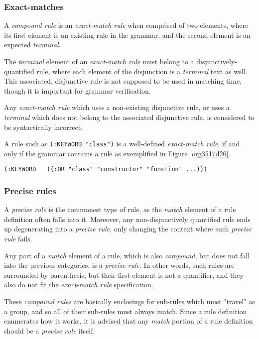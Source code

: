 \documentclass[a4paper,11pt,oneside]{article}
\begin{document}
\subsubsection*{Exact-matches}
\label{sec:org6adf2c6}

A \emph{compound rule} is an \emph{exact-match rule} when comprised of two elements,
where its first element is an existing rule in the grammar, and the
second element is an expected \emph{terminal}.

The \emph{terminal} element of an \emph{exact-match rule} must belong to a
disjunctively-quantified rule, where each element of the disjunction
is a \emph{terminal} text as well. This associated, disjunctive rule is not
supposed to be used in matching time, though it is important for
grammar verification.

Any \emph{exact-match rule} which uses a non-existing disjunctive rule, or
uses a \emph{terminal} which does not belong to the associated disjunctive
rule, is considered to be syntactically incorrect.

A rule such as \texttt{(:KEYWORD "class")} is a well-defined \emph{exact-match rule},
if and only if the grammar contains a rule as exemplified in Figure
\ref{org3517d26}.

\begin{verbatim}
(:KEYWORD   ((:OR "class" "constructor" "function" ...)))
\end{verbatim}

\subsubsection*{Precise rules}
\label{sec:org14ab56b}

A \emph{precise rule} is the commonest type of rule, as the \emph{match}
element of a rule definition often falls into it. Moreover, any
non-disjunctively quantified rule ends up degenerating into a \emph{precise
rule}, only changing the context where such \emph{precise rule} fails.

Any part of a \emph{match} element of a rule, which is also \emph{compound}, but
does not fall into the previous categories, is a \emph{precise rule}. In
other words, such rules are surrounded by parenthesis, but their first
element is not a quantifier, and they also do not fit the \emph{exact-match
rule} specification.

These \emph{compound rules} are basically enclosings for sub-rules which must
"travel" as a group, and so all of their sub-rules must always
match. Since a rule definition enumerates how it works, it is advised
that any \emph{match} portion of a rule definition should be a \emph{precise rule}
itself.
\end{document}
